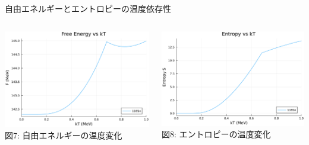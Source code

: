 \documentclass[aspectratio=169, 12pt, dvipdfmx]{beamer}
\begin{document}
\begin{frame}{自由エネルギーとエントロピーの温度依存性}
  \begin{columns}[totalwidth=1.0\linewidth]
    \begin{column}[T]{0.5\linewidth}
      \centering
      \includegraphics[width=\textwidth]{F_vs_kT.pdf}
      \vspace{5pt} %
      \scriptsize 図7: 自由エネルギーの温度変化
    \end{column}

  \begin{column}[T]{0.5\linewidth}
    \centering
    \includegraphics[width=\textwidth]{S_vs_kT.pdf}
    \vspace{5pt} %
    \scriptsize 図8: エントロピーの温度変化
  \end{column}
  \end{columns}
\end{frame}
\end{document}
